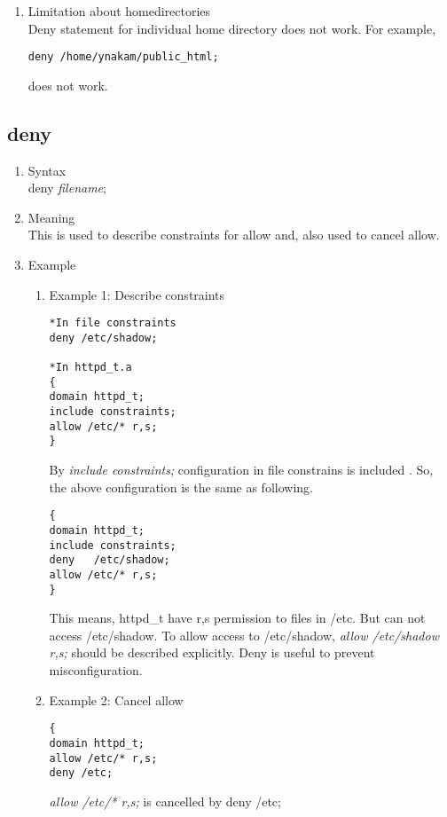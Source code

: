 \documentclass{article}
\begin{document}
\begin{enumerate}
	\begin{verbatim}
Example:
        {
          program /usr/sbin/httpd;
          allow /var/www/cgi-bin/test.cgi r,s,dx;
        }
        {
          program /var/www/cgi-bin/test.cgi;
          allow ............
        }
	\end{verbatim}
	In this case, /usr/sbin/httpd have dx permission to
	test.cgi. Domain is defined below. So, test.cgi runs as
	different domain.           
  \item Limitation about homedirectories\\
	Deny statement for individual home directory does not work.
	For example,
	\begin{verbatim}
deny /home/ynakam/public_html;
	\end{verbatim}
does not work.

 \end{enumerate}

\subsection{deny}
\begin{enumerate}
 \item Syntax\\
 deny {\it filename};
 \item Meaning\\
This is used to describe constraints for allow and, also used to cancel allow.
 \item Example
\begin{enumerate}
 \item Example 1: Describe constraints\\
   \begin{verbatim}
*In file constraints
deny /etc/shadow;

*In httpd_t.a
{
domain httpd_t;
include constraints;
allow /etc/* r,s; 
}
   \end{verbatim}
By {\it include constraints;} configuration in file constrains is
       included .
So, the above configuration is the same as following.
       \begin{verbatim}
{
domain httpd_t;
include constraints;
deny   /etc/shadow;
allow /etc/* r,s;
}
       \end{verbatim}
This means, httpd\_t have r,s permission to files in /etc. But can not
       access /etc/shadow.
To allow access to /etc/shadow, 
{\it allow /etc/shadow r,s;} should be described explicitly.
Deny is useful to prevent misconfiguration.

 \item Example 2: Cancel allow\\
\begin{verbatim}
{
domain httpd_t;
allow /etc/* r,s;
deny /etc;
\end{verbatim}
{\it allow /etc/* r,s;} is cancelled by deny /etc;

\end{enumerate}
\end{enumerate}
\end{document}
